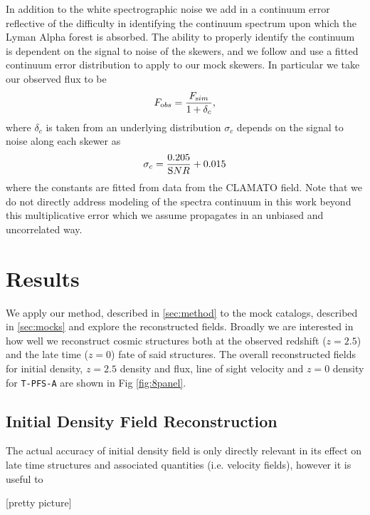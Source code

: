 \documentclass[times]{aastex62}
\begin{document}
In addition to the white spectrographic noise we add in a continuum error reflective of the difficulty in identifying the continuum spectrum upon which the Lyman Alpha forest is absorbed. The ability to properly identify the continuum is dependent on the signal to noise of the skewers, and we follow \cite{2018Krolewski} and use a fitted continuum error distribution to apply to our mock skewers. In particular we take our observed flux to be 
\begin{equation}
    F_{\textrm obs} = \frac{F_{\text sim}}{1+\delta_c},
\end{equation}
where $\delta_c$ is taken from an underlying distribution $\sigma_c$ depends on the signal to noise along each skewer as
\begin{equation}
 \sigma_c = \frac{0.205}{{\textrm SNR}} + 0.015
\end{equation}
where the constants are fitted from data from the CLAMATO field. Note that we do not directly address modeling of the spectra continuum in this work beyond this multiplicative error which we assume propagates in an unbiased and uncorrelated way. %



\section{Results}

We apply our method, described in \ref{sec:method} to the mock catalogs, described in \ref{sec:mocks} and explore the reconstructed fields. Broadly we are interested in how well we reconstruct cosmic structures both at the observed redshift ($z=2.5$) and the late time ($z=0$) fate of said structures. The overall reconstructed fields for initial density, $z=2.5$ density and flux, line of sight velocity and $z=0$ density for \texttt{T-PFS-A} are shown in Fig \ref{fig:8panel}.

\subsection{Initial Density Field Reconstruction}

The actual accuracy of initial density field is only directly relevant in its effect on late time structures and associated quantities (i.e. velocity fields), however it is useful to 

[pretty picture]
\end{document}
